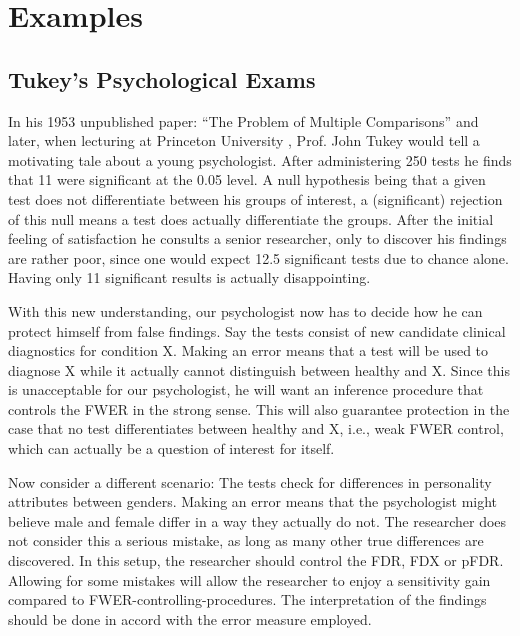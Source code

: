 \documentclass[review,12pt]{article}
\theoremstyle{definition}
\theoremstyle{definition}
\begin{document}
\section{\label{sec:examples}Examples}




\subsection{\label{sec:tukey_exams}Tukey's Psychological Exams}
In his 1953 unpublished paper: ``The Problem of Multiple Comparisons'' \citep{benjamini_john_2002} and later, when lecturing at Princeton University \citep{donoho_higher_2004}, Prof. John Tukey would tell a motivating tale about a young psychologist. After administering 250 tests he finds that 11 were significant at the 0.05 level. A null hypothesis being that a given test does not differentiate between his groups of interest, a (significant) rejection of this null means a test does actually differentiate the groups.
After the initial feeling of satisfaction he consults a senior researcher, only to discover his findings are rather poor, since one  would expect 12.5 significant tests due to chance alone. Having only 11 significant results is actually disappointing.


With this new understanding, our psychologist now has to decide how he can protect himself from false findings. 
Say the tests consist of new candidate clinical diagnostics for condition X. Making an error means that a test will be used to diagnose X while it actually cannot distinguish between healthy and X. Since this is unacceptable for our psychologist, he will want an inference procedure that controls the FWER in the strong sense. This will also guarantee protection  in the case that no test differentiates between healthy and X, i.e., weak FWER control, which can actually be a question of interest for itself.


Now consider a different scenario: The tests check for differences in personality attributes between genders. Making an error means that the psychologist might believe male and female differ in a way they actually do not. The researcher does not consider this a serious mistake, as long as many other true differences are discovered. In this setup, the researcher should control the FDR, FDX or pFDR. 
Allowing for some mistakes will allow the researcher to enjoy a sensitivity gain compared to FWER-controlling-procedures. The interpretation of the findings should be done in accord with the error measure employed.
\end{document}
